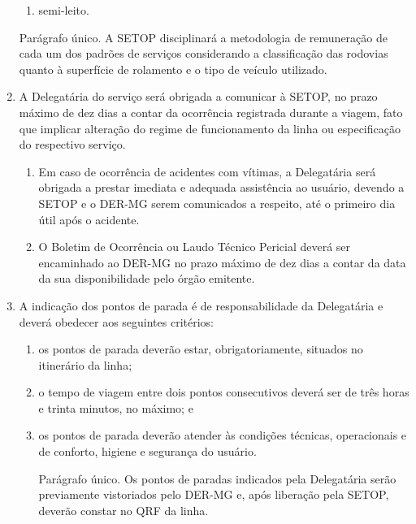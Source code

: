 \begin{enumerate}[resume, label=Art. \arabic*]
\begin{enumerate}[label=\roman*.]
\item semi-leito.

\end{enumerate}

Parágrafo único. A SETOP disciplinará a metodologia de remuneração de cada um dos padrões de serviços considerando a classificação das rodovias quanto à superfície de rolamento e o tipo de veículo utilizado.

\item A Delegatária do serviço será obrigada a comunicar à SETOP, no prazo máximo de dez dias a contar da ocorrência registrada durante a viagem, fato que implicar alteração do regime de funcionamento da linha ou especificação do respectivo serviço.

\begin{enumerate}[label= \S \arabic*] %

\item Em caso de ocorrência de acidentes com vítimas, a Delegatária será obrigada a prestar imediata e adequada assistência ao usuário, devendo a SETOP e o DER-MG serem comunicados a respeito, até o primeiro dia útil após o acidente.

\item O Boletim de Ocorrência ou Laudo Técnico Pericial deverá ser encaminhado ao DER-MG no prazo máximo de dez dias a contar da data da sua disponibilidade pelo órgão emitente.

\end{enumerate}

\item A indicação dos pontos de parada é de responsabilidade da Delegatária e deverá obedecer aos seguintes critérios:

\begin{enumerate}[label=\roman*.]

\item os pontos de parada deverão estar, obrigatoriamente, situados no itinerário da linha;

\item o tempo de viagem entre dois pontos consecutivos deverá ser de três horas e trinta minutos, no máximo; e

\item os pontos de parada deverão atender às condições técnicas, operacionais e de conforto, higiene e segurança do usuário.

Parágrafo único. Os pontos de paradas indicados pela Delegatária serão previamente vistoriados pelo DER-MG e, após liberação pela SETOP, deverão constar no QRF da linha.


\end{enumerate}
\end{enumerate}
